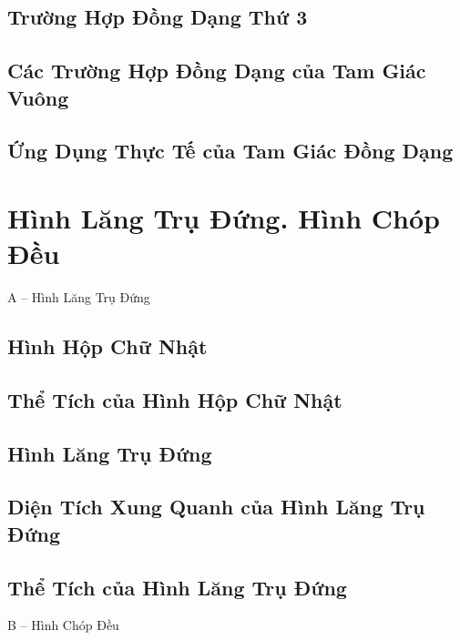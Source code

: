 \documentclass[oneside]{book}
\numberwithin{equation}{section}
\begin{document}
\section{Trường Hợp Đồng Dạng Thứ 3}

\section{Các Trường Hợp Đồng Dạng của Tam Giác Vuông}

\section{Ứng Dụng Thực Tế của Tam Giác Đồng Dạng}


\chapter{Hình Lăng Trụ Đứng. Hình Chóp Đều}

\begin{center}
	\Large A -- Hình Lăng Trụ Đứng
\end{center}

\section{Hình Hộp Chữ Nhật}

\section{Thể Tích của Hình Hộp Chữ Nhật}

\section{Hình Lăng Trụ Đứng}

\section{Diện Tích Xung Quanh của Hình Lăng Trụ Đứng}

\section{Thể Tích của Hình Lăng Trụ Đứng}

\begin{center}
	\Large B -- Hình Chóp Đều
\end{center}
\end{document}
